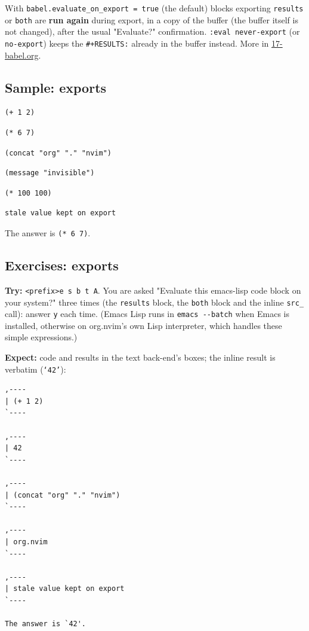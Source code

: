 With \texttt{babel.evaluate\_on\_export = true} (the default) blocks exporting
\texttt{results} or \texttt{both} are \textbf{run again} during export, in a copy of the buffer
(the buffer itself is not changed), after the usual "Evaluate?"
confirmation. \texttt{:eval never-export} (or \texttt{no-export}) keeps the \texttt{\#+RESULTS:}
already in the buffer instead. More in \href{17-babel.org}{17-babel.org}.
\subsection{Sample: exports}
\label{sec:org88af86c}
\begin{verbatim}
(+ 1 2)
\end{verbatim}

\begin{verbatim}
(* 6 7)
\end{verbatim}

\begin{verbatim}
(concat "org" "." "nvim")
\end{verbatim}

\begin{verbatim}
(message "invisible")
\end{verbatim}

\begin{verbatim}
(* 100 100)
\end{verbatim}

\label{org13650df}
\begin{verbatim}
stale value kept on export
\end{verbatim}

The answer is \texttt{(* 6 7)}.
\subsection{Exercises: exports}
\label{sec:orgebd05b4}
\textbf{Try:} \texttt{<prefix>e s b t A}. You are asked "Evaluate this emacs-lisp code
block on your system?" three times (the \texttt{results} block, the \texttt{both} block
and the inline \texttt{src\_} call): answer \texttt{y} each time. (Emacs Lisp runs in
\texttt{emacs -{}-{}batch} when Emacs is installed, otherwise on org.nvim's own Lisp
interpreter, which handles these simple expressions.)

\textbf{Expect:} code and results in the text back-end's boxes; the inline
result is verbatim (\texttt{`42'}):

\begin{verbatim}
,----
| (+ 1 2)
`----

,----
| 42
`----

,----
| (concat "org" "." "nvim")
`----

,----
| org.nvim
`----

,----
| stale value kept on export
`----

The answer is `42'.
\end{verbatim}

